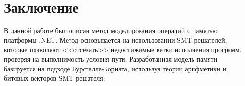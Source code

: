 \section{Заключение}
В данной работе был описан метод моделирования операций с памятью платформы .NET. Метод основывается на использовании SMT-решателей, которые позволяют <<отсекать>> недостижимые ветки исполнения программ, проверяя на выполнимость условия пути. Разработанная модель памяти базируется на подходе Бурсталла-Борната, используя теории арифметики и битовых векторов SMT-решателя.
